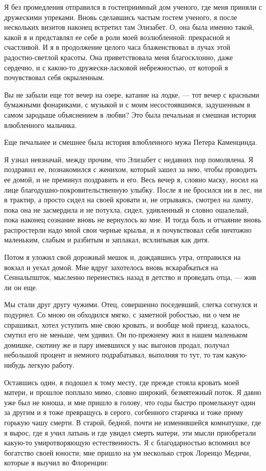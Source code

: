 Я без  промедления отправился  в гостеприимный  дом ученого,  где меня
приняли с дружескими упреками. Вновь сделавшись частым гостем ученого,
я после нескольких визитов наконец  встретил там Элизабет. О, она была
именно такой, какой я и представлял  ее себе в роли моей возлюбленной:
прекрасной и счастливой.  И я в продолжение  целого часа блаженствовал
в  лучах  этой  радостно-светлой   красоты.  Она  приветствовала  меня
благосклонно,   даже   сердечно,   и  с   какою-то   дружески-ласковой
небрежностью, от которой я почувствовал себя окрыленным.

Вы не забыли еще тот вечер на озере, катание на лодке, --- тот вечер с
красными  бумажными фонариками,  с  музыкой и  с моим  несостоявшимся,
задушенным в самом зародыше объяснением  в любви? Это была печальная и
смешная история влюбленного мальчика.

Еще  печальнее   и  смешнее  была  история   влюбленного  мужа  Петера
Каменцинда.

Я  узнал  невзначай,  между  прочим,   что  Элизабет  с  недавних  пор
помолвлена. Я поздравил  ее, познакомился с женихом,  который зашел за
нею, чтобы  проводить ее домой, и  не преминул поздравить и  его. Весь
вечер я,  словно маску,  носил на  лице благодушно-покровительственную
улыбку. После я не бросился ни в  лес, ни в трактир, а просто сидел на
своей  кровати  и,  не  отрываясь,  смотрел  на  лампу,  пока  она  не
засмердила и  не потухла,  сидел, удивленный  и словно  ошалелый, пока
наконец сознание  вновь не вернулось ко  мне. И тогда боль  и отчаяние
вновь распростерли надо мной свои черные крылья, и я почувствовал себя
ничтожно маленьким, слабым и разбитым и заплакал, всхлипывая как дитя.

Потом я уложил  свой дорожный мешок и, дождавшись  утра, отправился на
вокзал  и уехал  домой. Мне  вдруг захотелось  вновь вскарабкаться  на
Сеннальпшток, мысленно  перенестись назад в детство  и проведать отца,
--- жив ли он еще.

Мы  стали  друг  другу  чужими. Отец,  совершенно  поседевший,  слегка
согнулся и подурнел. Со мною  он обходился мягко, с заметной робостью,
ни о чем  не спрашивал, хотел уступить мне свою  кровать, и вообще мой
приезд, казалось, смутил его не меньше, чем удивил. Он по-прежнему жил
в нашем маленьком  домишке, скотину же и пару имевшихся  у нас выгонов
продал, получал небольшой процент  и немного подрабатывал, выполняя то
тут, то там какую-нибудь легкую работу.

Оставшись один, я подошел к тому месту, где прежде стояла кровать моей
матери, и прошлое  поплыло мимо, словно широкий,  безмятежный поток. Я
давно  уже был  не  юноша, и  мне  пришло в  голову,  что годы  быстро
промелькнут один  за другим и  я тоже превращусь в  серого, согбенного
старичка и тоже приму горькую чашу  смерти. В старой, бедной, почти не
изменившейся  комнатушке,  где  я  вырос,  где я  учил  латынь  и  где
увидел смерть  матери, эти  мысли приобретали  какую-то умиротворяющую
естественность.  Я  с  благодарностью  вспомнил  все  богатство  своей
юности; мне  пришло на  ум несколько строк  Лоренцо Медичи,  которые я
выучил во Флоренции:

